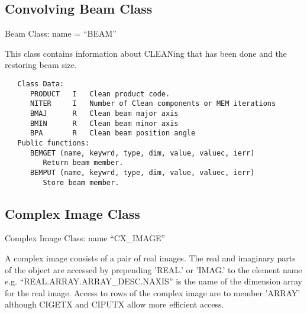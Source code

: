 \subsection{Convolving Beam Class}
   Beam Class:  name = ``BEAM''

   This class contains information about CLEANing that has been done
and the restoring beam size.
{\small\begin{verbatim}
   Class Data:
      PRODUCT   I   Clean product code.
      NITER     I   Number of Clean components or MEM iterations
      BMAJ      R   Clean beam major axis
      BMIN      R   Clean beam minor axis
      BPA       R   Clean beam position angle
   Public functions:
      BEMGET (name, keywrd, type, dim, value, valuec, ierr)
         Return beam member.
      BEMPUT (name, keywrd, type, dim, value, valuec, ierr)
         Store beam member.
\end{verbatim}}

\subsection{Complex Image Class}
   Complex Image Class: name ``CX\_IMAGE''

A complex image consists of a pair of real images.  The real and
imaginary parts of the object are accessed by prepending 'REAL.' or
'IMAG.' to the element name e.g. ``REAL.ARRAY.ARRAY\_DESC.NAXIS'' is
the name of the dimension array for the real image.  Access to rows
of the complex image are to member 'ARRAY' although CIGETX and
CIPUTX allow more efficient access.

